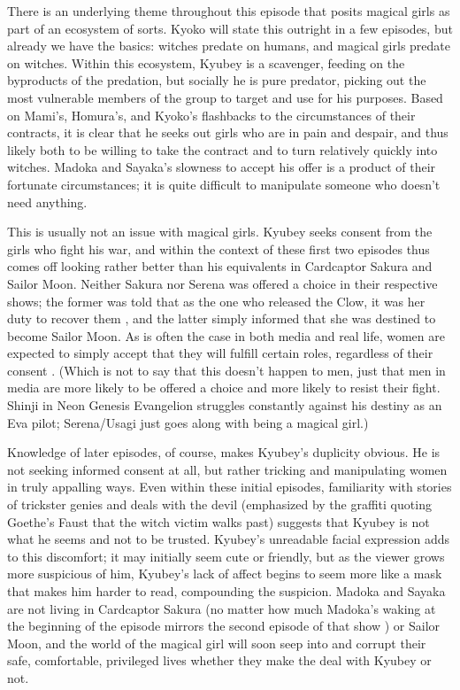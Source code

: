 There is an underlying theme throughout this episode that posits magical girls as part of an ecosystem of sorts. Kyoko will state this outright in a few episodes, but already we have the basics: witches predate on humans, and magical girls predate on witches. Within this ecosystem, Kyubey is a scavenger, feeding on the byproducts of the predation, but socially he is pure predator, picking out the most vulnerable members of the group to target and use for his purposes. Based on Mami's, Homura's, and Kyoko's flashbacks to the circumstances of their contracts, it is clear that he seeks out girls who are in pain and despair, and thus likely both to be willing to take the contract and to turn relatively quickly into witches. Madoka and Sayaka's slowness to accept his offer is a product of their fortunate circumstances; it is quite difficult to manipulate someone who doesn't need anything.

This is usually not an issue with magical girls. Kyubey seeks consent from the girls who fight his war, and within the context of these first two episodes thus comes off looking rather better than his equivalents in Cardcaptor Sakura and Sailor Moon. Neither Sakura nor Serena was offered a choice in their respective shows; the former was told that as the one who released the Clow, it was her duty to recover them \cite{ref30}, and the latter simply informed that she was destined to become Sailor Moon. As is often the case in both media and real life, women are expected to simply accept that they will fulfill certain roles, regardless of their consent \cite{ref31}. (Which is not to say that this doesn't happen to men, just that men in media are more likely to be offered a choice and more likely to resist their fight. Shinji in Neon Genesis Evangelion struggles constantly against his destiny as an Eva pilot; Serena/Usagi just goes along with being a magical girl.)

Knowledge of later episodes, of course, makes Kyubey's duplicity obvious. He is not seeking informed consent at all, but rather tricking and manipulating women in truly appalling ways. Even within these initial episodes, familiarity with stories of trickster genies and deals with the devil (emphasized by the graffiti quoting Goethe's Faust that the witch victim walks past) suggests that Kyubey is not what he seems and not to be trusted. Kyubey's unreadable facial expression adds to this discomfort; it may initially seem cute or friendly, but as the viewer grows more suspicious of him, Kyubey's lack of affect begins to seem more like a mask that makes him harder to read, compounding the suspicion. Madoka and Sayaka are not living in Cardcaptor Sakura (no matter how much Madoka's waking at the beginning of the episode mirrors the second episode of that show \cite{ref32}) or Sailor Moon, and the world of the magical girl will soon seep into and corrupt their safe, comfortable, privileged lives whether they make the deal with Kyubey or not. 

